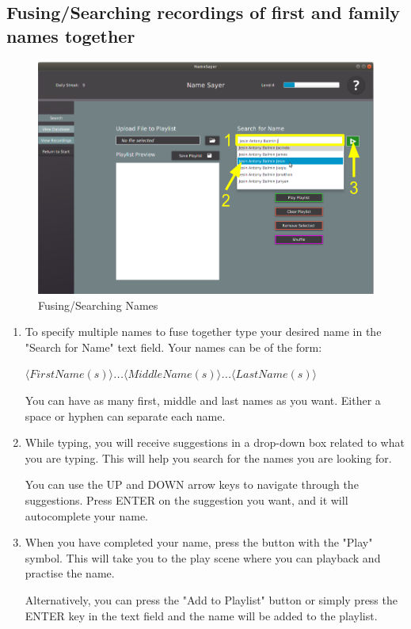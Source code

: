 \documentclass[a4paper,12pt]{article}
\begin{document}
\subsection{Fusing/Searching recordings of first and family names together}
\begin{figure}[!h]
	\includegraphics[width=\linewidth]{search.png}
	\caption{Fusing/Searching Names}
\end{figure}
\begin{enumerate}[label=\textbf{\arabic*}]
	\item To specify multiple names to fuse together type your desired name in the "Search for Name" text field. Your names can be of the form:
	
	
	\textit{$\langle First Name(s)\rangle$...$\langle Middle Name(s)\rangle$...$\langle Last Name(s)\rangle$}
	
	
	
	You can have as many first, middle and last names as you want. Either a space or hyphen can separate each name.

	\item While typing, you will receive suggestions in a drop-down box related to what you are typing. This will help you search for the names you are looking for.
	
	You can use the UP and DOWN arrow keys to navigate through the suggestions. Press ENTER on the suggestion you want, and it will autocomplete your name.

	\item When you have completed your name, press the button with the "Play" symbol. This will take you to the play scene where you can playback and practise the name. 

	Alternatively, you can press the "Add to Playlist" button or simply press the ENTER key in the text field and the name will be added to the playlist.

\end{enumerate}
\end{document}
